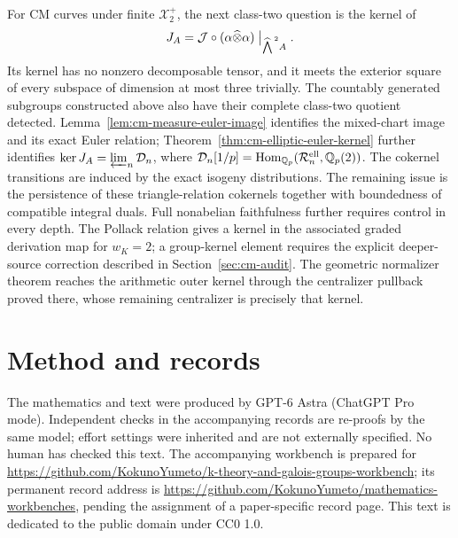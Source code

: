 \documentclass[11pt]{article}
\theoremstyle{definition}\newtheorem{definition}[theorem]{Definition}
\newcommand{\workbenchurl}{https://github.com/KokunoYumeto/k-theory-and-galois-groups-workbench}
\newcommand{\recordurl}{https://github.com/KokunoYumeto/mathematics-workbenches}
\begin{document}
For CM curves under finite $\mathcal X_2^+$, the next class-two question is the kernel of
\[
 J_A=\mathcal J\circ(\alpha\widehat\otimes\alpha)
           \bigm|_{\widehat{\bigwedge}^{\,2}A}.
\]
Its kernel has no nonzero decomposable tensor, and it meets the exterior square of every subspace of dimension at most three trivially. The countably generated subgroups constructed above also have their complete class-two quotient detected. Lemma~\ref{lem:cm-measure-euler-image} identifies the mixed-chart image and its exact Euler relation; Theorem~\ref{thm:cm-elliptic-euler-kernel} further identifies
\(\ker J_A=\varprojlim_n\mathcal D_n\), where
\(\mathcal D_n[1/p]=\operatorname{Hom}_{\mathbb Q_p}
(\mathcal R_n^{\rm ell},\mathbb Q_p(2))\).
The cokernel transitions are induced by the exact isogeny distributions.
The remaining issue is the persistence of these triangle-relation
cokernels together with boundedness of compatible integral duals. Full nonabelian faithfulness further requires control in every depth. The Pollack relation gives a kernel in the associated graded derivation map for $w_K=2$; a group-kernel element requires the explicit deeper-source correction described in Section~\ref{sec:cm-audit}. The geometric normalizer theorem reaches the arithmetic outer kernel through the centralizer pullback proved there, whose remaining centralizer is precisely that kernel.

\section*{Method and records}
The mathematics and text were produced by GPT-6 Astra (ChatGPT Pro mode). Independent checks in the accompanying records are re-proofs by the same model; effort settings were inherited and are not externally specified. No human has checked this text. The accompanying workbench is prepared for \url{\workbenchurl}; its permanent record address is \url{\recordurl}, pending the assignment of a paper-specific record page. This text is dedicated to the public domain under CC0 1.0.
\end{document}
